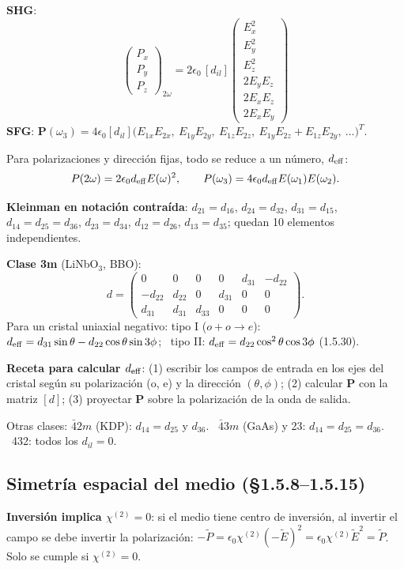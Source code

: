 \documentclass[10pt]{article}
\newcommand{\E}{\mathbf E}
\begin{document}
\begin{clave}[title={Polarización en notación contraída (1.5.26–1.5.29)}]
\textbf{SHG}:
\[
\begin{pmatrix}P_x\\P_y\\P_z\end{pmatrix}_{2\omega}=2\epsilon_0\,[d_{il}]\begin{pmatrix}E_x^2\\E_y^2\\E_z^2\\2E_yE_z\\2E_xE_z\\2E_xE_y\end{pmatrix}
\]
\textbf{SFG}: $\mathbf P(\omega_3)=4\epsilon_0[d_{il}]\big(E_{1x}E_{2x},\ E_{1y}E_{2y},\ E_{1z}E_{2z},\ E_{1y}E_{2z}+E_{1z}E_{2y},\ \ldots\big)^T$.

Para polarizaciones y dirección fijas, todo se reduce a un número, $d_{\rm eff}$:
\[
P(2\omega)=2\epsilon_0d_{\rm eff}E(\omega)^2,\qquad P(\omega_3)=4\epsilon_0d_{\rm eff}E(\omega_1)E(\omega_2).
\]
\end{clave}
\textbf{Kleinman en notación contraída}: $d_{21}=d_{16}$, $d_{24}=d_{32}$, $d_{31}=d_{15}$, $d_{14}=d_{25}=d_{36}$, $d_{23}=d_{34}$, $d_{12}=d_{26}$, $d_{13}=d_{35}$; quedan 10 elementos independientes.

\textbf{Clase 3m} (LiNbO$_3$, BBO):
\[
d=\begin{pmatrix}0&0&0&0&d_{31}&-d_{22}\\-d_{22}&d_{22}&0&d_{31}&0&0\\d_{31}&d_{31}&d_{33}&0&0&0\end{pmatrix}.
\]
Para un cristal uniaxial negativo:
tipo I ($o+o\to e$): $d_{\rm eff}=d_{31}\sin\theta-d_{22}\cos\theta\sin3\phi$; \ tipo II: $d_{\rm eff}=d_{22}\cos^2\theta\cos3\phi$ (1.5.30).

\textbf{Receta para calcular $d_{\rm eff}$}: (1) escribir los campos de entrada en los ejes del cristal según su polarización (o, e) y la dirección $(\theta,\phi)$; (2) calcular $\mathbf P$ con la matriz $[d]$; (3) proyectar $\mathbf P$ sobre la polarización de la onda de salida.

Otras clases: $\bar42m$ (KDP): $d_{14}=d_{25}$ y $d_{36}$. \ $\bar43m$ (GaAs) y 23: $d_{14}=d_{25}=d_{36}$. \ 432: todos los $d_{il}=0$.

\subsection{Simetría espacial del medio (§1.5.8–1.5.15)}
\textbf{Inversión implica $\chi^{(2)}=0$}: si el medio tiene centro de inversión, al invertir el campo se debe invertir la polarización: $-\tilde P=\epsilon_0\chi^{(2)}(-\tilde E)^2=\epsilon_0\chi^{(2)}\tilde E^2=\tilde P$. Solo se cumple si $\chi^{(2)}=0$.
\end{document}
